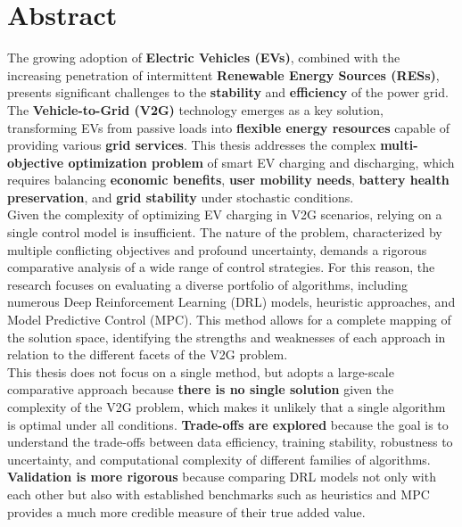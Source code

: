 \section*{Abstract}
The growing adoption of \textbf{Electric Vehicles (EVs)}, combined with the increasing penetration of intermittent \textbf{Renewable Energy Sources (RESs)}, presents significant challenges to the \textbf{stability} and \textbf{efficiency} of the power grid. The \textbf{Vehicle-to-Grid (V2G)} technology emerges as a key solution, transforming EVs from passive loads into \textbf{flexible energy resources} capable of providing various \textbf{grid services}. This thesis addresses the complex \textbf{multi-objective optimization problem} of smart EV charging and discharging, which requires balancing \textbf{economic benefits}, \textbf{user mobility needs}, \textbf{battery health preservation}, and \textbf{grid stability} under stochastic conditions.
\\
Given the complexity of optimizing EV charging in V2G scenarios, relying on a single control model is insufficient. The nature of the problem, characterized by multiple conflicting objectives and profound uncertainty, demands a rigorous comparative analysis of a wide range of control strategies.
For this reason, the research focuses on evaluating a diverse portfolio of algorithms, including numerous Deep Reinforcement Learning (DRL) models, heuristic approaches, and Model Predictive Control (MPC). This method allows for a complete mapping of the solution space, identifying the strengths and weaknesses of each approach in relation to the different facets of the V2G problem.
\\
\noindent
This thesis does not focus on a single method, but adopts a large-scale comparative approach because \noindent\textbf{there is no single solution} given the complexity of the V2G problem, which makes it unlikely that a single algorithm is optimal under all conditions.\noindent
\textbf{Trade-offs are explored} because the goal is to understand the trade-offs between data efficiency, training stability, robustness to uncertainty, and computational complexity of different families of algorithms.
\noindent\textbf{Validation is more rigorous} because comparing DRL models not only with each other but also with established benchmarks such as heuristics and MPC provides a much more credible measure of their true added value.




\newpage
